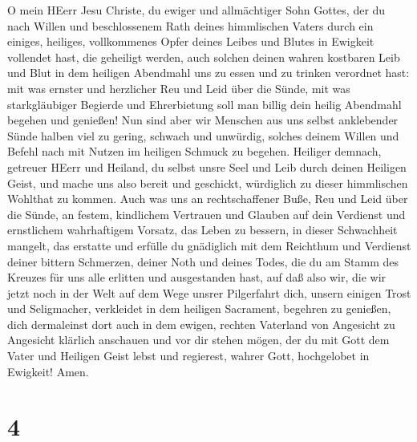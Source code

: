 O mein HEerr Jesu Christe, du ewiger und allmächtiger Sohn Gottes, der du nach Willen und beschlossenem Rath deines himmlischen Vaters durch ein einiges, heiliges, vollkommenes Opfer deines Leibes und Blutes in Ewigkeit
vollendet hast, die geheiligt werden, auch solchen deinen wahren kostbaren Leib und Blut in dem heiligen Abendmahl uns zu essen und zu trinken verordnet hast: mit was ernster und herzlicher Reu und Leid über die Sünde, mit was starkgläubiger Begierde und Ehrerbietung soll man billig dein heilig Abendmahl begehen und genießen! Nun sind aber wir Menschen aus uns selbst anklebender Sünde halben viel zu gering, schwach und unwürdig, solches deinem Willen und Befehl nach mit Nutzen im heiligen Schmuck zu begehen. Heiliger demnach, getreuer HEerr und Heiland, du selbst unsre Seel und Leib durch deinen Heiligen Geist, und mache uns also bereit und geschickt, würdiglich zu dieser himmlischen Wohlthat zu kommen. Auch was uns an rechtschaffener Buße, Reu und Leid über die Sünde, an festem, kindlichem Vertrauen und Glauben auf dein Verdienst und ernstlichem wahrhaftigem Vorsatz, das Leben zu bessern, in dieser Schwachheit mangelt, das erstatte und erfülle du gnädiglich mit dem Reichthum und Verdienst deiner bittern Schmerzen, deiner Noth und deines Todes, die du am Stamm des Kreuzes für uns alle erlitten und ausgestanden hast, auf daß also wir, die wir jetzt noch in der Welt auf dem Wege unsrer Pilgerfahrt dich, unsern einigen Trost und Seligmacher, verkleidet in dem heiligen Sacrament, begehren zu genießen, dich dermaleinst dort auch in dem ewigen, rechten Vaterland von Angesicht zu Angesicht klärlich anschauen und vor dir stehen mögen, der du mit Gott dem Vater und Heiligen Geist lebst und regierest, wahrer Gott, hochgelobet in Ewigkeit! Amen.

\section{4}

